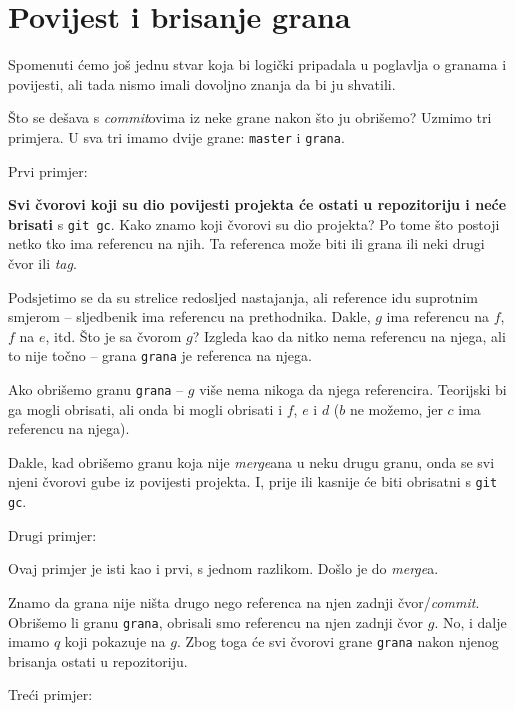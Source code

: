 \section*{Povijest i brisanje grana}

Spomenuti ćemo još jednu stvar koja bi logički pripadala u poglavlja o granama i povijesti, ali tada nismo imali dovoljno znanja da bi ju shvatili.

Što se dešava s \emph{commit}ovima iz neke grane nakon što ju obrišemo?
Uzmimo tri primjera.
U sva tri imamo dvije grane: \verb+master+ i \verb+grana+.

Prvi primjer:



\textbf{Svi čvorovi koji su dio povijesti projekta će ostati u repozitoriju i neće brisati} s \verb+git gc+.
Kako znamo koji čvorovi su dio projekta?
Po tome što postoji netko tko ima referencu na njih.
Ta referenca može biti ili grana ili neki drugi čvor ili \emph{tag}.

Podsjetimo se da su strelice redosljed nastajanja, ali reference idu suprotnim smjerom -- sljedbenik ima referencu na prethodnika.
Dakle, $g$ ima referencu na $f$, $f$ na $e$, itd.
Što je sa čvorom $g$? 
Izgleda kao da nitko nema referencu na njega, ali to nije točno -- grana \verb+grana+ je referenca na njega.

Ako obrišemo granu \verb+grana+ -- $g$ više nema nikoga da njega referencira.
Teorijski bi ga mogli obrisati, ali onda bi mogli obrisati i $f$, $e$ i $d$ ($b$ ne možemo, jer $c$ ima referencu na njega).

Dakle, kad obrišemo granu koja nije \emph{merge}ana u neku drugu granu, onda se svi njeni čvorovi gube iz povijesti projekta.
I, prije ili kasnije će biti obrisatni s \verb+git gc+.

Drugi primjer:



Ovaj primjer je isti kao i prvi, s jednom razlikom. 
Došlo je do \emph{merge}a.

Znamo da grana nije ništa drugo nego referenca na njen zadnji čvor/\emph{commit}.
Obrišemo li granu \verb+grana+, obrisali smo referencu na njen zadnji čvor $g$.
No, i dalje imamo $q$ koji pokazuje na $g$.
Zbog toga će svi čvorovi grane \verb+grana+ nakon njenog brisanja ostati u repozitoriju.

Treći primjer:

